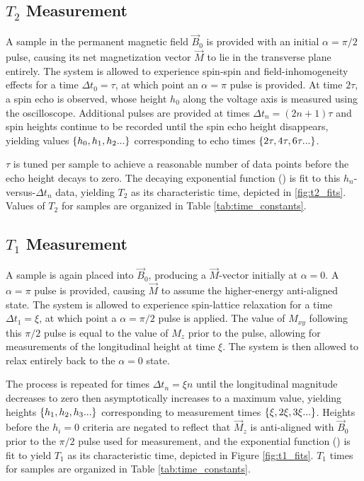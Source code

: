 \documentclass[11pt]{article}
\DeclarePairedDelimiter{\set}{\{}{\}}
\begin{document}
\subsection{$T_2$ Measurement}

A sample in the permanent magnetic field $\vec B_0$ is provided with
an initial $\alpha =\pi/2$ pulse, causing its net
magnetization vector $\vec M$ to lie in the transverse plane entirely. The
system is allowed
to experience spin-spin and field-inhomogeneity effects for a time
$\Delta t_0 = \tau$, at which point
an $\alpha=\pi$ pulse is provided. At time $2 \tau$, a spin echo is
observed, whose height $h_0$ along the voltage axis is measured using the
oscilloscope. Additional pulses are
provided at times $\Delta t_n = (2n + 1) \tau$ and spin heights
continue to be recorded until the
spin echo height disappears, yielding values $\set{h_0, h_1, h_2...}$
corresponding to echo times $\set{2\tau, 4\tau, 6\tau...}$.

$\tau$
is tuned per sample to achieve a reasonable
number of data points before the echo height decays to zero. The
decaying exponential function ()
is fit to this $h_n$-versus-$\Delta t_n$ data, yielding $T_2$ as its
characteristic time, depicted in \ref{fig:t2_fits}. Values of $T_2$
for samples are organized in Table
\ref{tab:time_constants}.

\subsection{$T_1$ Measurement}

A sample is again placed into $\vec B_0$, producing a $\vec M$-vector
initially at $\alpha = 0$. A $\alpha=\pi$ pulse is provided, causing
$\vec M$ to assume the
higher-energy anti-aligned state. The system is allowed to experience
spin-lattice relaxation for a time $\Delta t_1 = \xi$, at which point
a $\alpha=\pi/2$ pulse
is applied. The value of $M_{xy}$ following this $\pi/2$ pulse is equal to the
value of $M_z$ prior to the pulse, allowing for measurements of the
longitudinal height at time $\xi$. The system is then allowed to
relax entirely back to the $\alpha = 0$ state.

The process is repeated for times $\Delta t_n = \xi n$ until the
longitudinal magnitude decreases to zero then asymptotically increases
to a maximum value, yielding
heights $\set{h_1, h_2, h_3...}$ corresponding to measurement times
$\set{\xi, 2\xi, 3\xi...}$. Heights before the $h_i = 0$ criteria are negated
to reflect that $\vec M_z$ is anti-aligned with $\vec B_0$ prior to
the $\pi/2$ pulse used for measurement, and the exponential function
() is fit to yield $T_1$ as its
characteristic time, depicted in Figure \ref{fig:t1_fits}. $T_1$ times
for samples are organized in Table \ref{tab:time_constants}.
\end{document}
